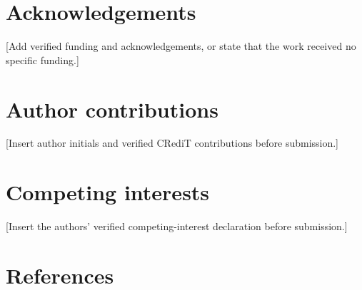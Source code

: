 \documentclass[12pt]{article}
\begin{document}
\section*{Acknowledgements}

\colorbox{placeholder}{\parbox{0.95\linewidth}{[Add verified funding and acknowledgements, or state that the work received no specific funding.]}}

\section*{Author contributions}

\colorbox{placeholder}{\parbox{0.95\linewidth}{[Insert author initials and verified CRediT contributions before submission.]}}

\section*{Competing interests}

[Insert the authors' verified competing-interest declaration before submission.]

\section*{References}
\end{document}
